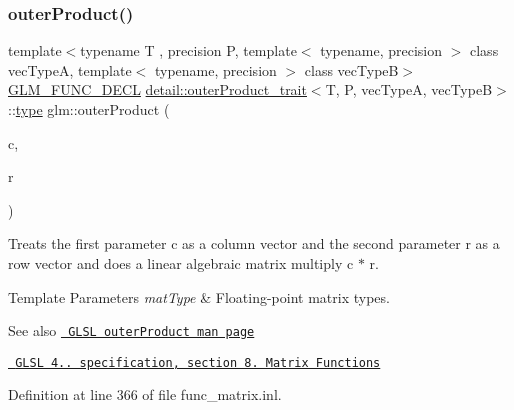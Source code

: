 \subsubsection{\texorpdfstring{outerProduct()}{outerProduct()}}
{\footnotesize\ttfamily template$<$typename T , precision P, template$<$ typename, precision $>$ class vec\+TypeA, template$<$ typename, precision $>$ class vec\+TypeB$>$ \\
\mbox{\hyperlink{setup_8hpp_ab2d052de21a70539923e9bcbf6e83a51}{G\+L\+M\+\_\+\+F\+U\+N\+C\+\_\+\+D\+E\+CL}} \mbox{\hyperlink{structglm_1_1detail_1_1outer_product__trait}{detail\+::outer\+Product\+\_\+trait}}$<$T, P, vec\+TypeA, vec\+TypeB$>$\+::\mbox{\hyperlink{structglm_1_1type}{type}} glm\+::outer\+Product (\begin{DoxyParamCaption}\item[{vec\+TypeA$<$ T, P $>$ const \&}]{c,  }\item[{vec\+TypeB$<$ T, P $>$ const \&}]{r }\end{DoxyParamCaption})}

Treats the first parameter c as a column vector and the second parameter r as a row vector and does a linear algebraic matrix multiply c $\ast$ r.


\begin{DoxyTemplParams}{Template Parameters}
{\em mat\+Type} & Floating-\/point matrix types.\\
\hline
\end{DoxyTemplParams}
\begin{DoxySeeAlso}{See also}
\href{http://www.opengl.org/sdk/docs/manglsl/xhtml/outerProduct.xml}{\texttt{ G\+L\+SL outer\+Product man page}} 

\href{http://www.opengl.org/registry/doc/GLSLangSpec.4.20.8.pdf}{\texttt{ G\+L\+SL 4.. specification, section 8. Matrix Functions}} 
\end{DoxySeeAlso}


Definition at line 366 of file func\+\_\+matrix.\+inl.


